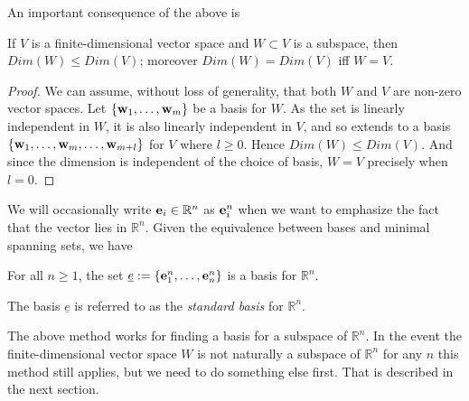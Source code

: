 \documentclass{ximera}
\begin{document}
An important consequence of the above is

\begin{proposition} If $V$ is a finite-dimensional vector space and $W\subset V$ is a subspace, then $Dim(W)\le Dim(V)$; moreover $Dim(W) = Dim(V)$ iff $W=V$.
\end{proposition}

\begin{proof} We can assume, without loss of generality, that both $W$ and $V$ are non-zero vector spaces. Let $\{ {\bf w}_1,\dots,{\bf w}_m\}$ be a basis for $W$. As the set is linearly independent in $W$, it is also linearly independent in $V$, and so extends to a basis $\{{\bf w}_1,\dots,{\bf w}_m,\dots, {\bf w}_{m+l}\}$ for $V$ where $l\ge 0$. Hence $Dim(W)\le Dim(V)$. And since the dimension is independent of the choice of basis, $W=V$ precisely when $l=0$.
\end{proof}

We will occasionally write ${\bf e}_i\in\mathbb R^n$ as ${\bf e}_i^n$ when we want to emphasize the fact that the vector lies in $\mathbb R^n$. Given the equivalence between bases and minimal spanning sets, we have

\begin{proposition} For all $n\ge 1$, the set $\underline{e} := \{{\bf e}_1^n,\dots,{\bf e}_n^n\}$ is a basis for $\mathbb R^n$.
\end{proposition}

The basis $\underline{e}$ is referred to as the {\it standard basis} for $\mathbb R^n$.

The above method works for finding a basis for a subspace of $\mathbb R^n$. In the event the finite-dimensional vector space $W$ is not naturally a subspace of $\mathbb R^n$ for any $n$ this method still applies, but we need to do something else first. That is described in the next section.
\end{document}
